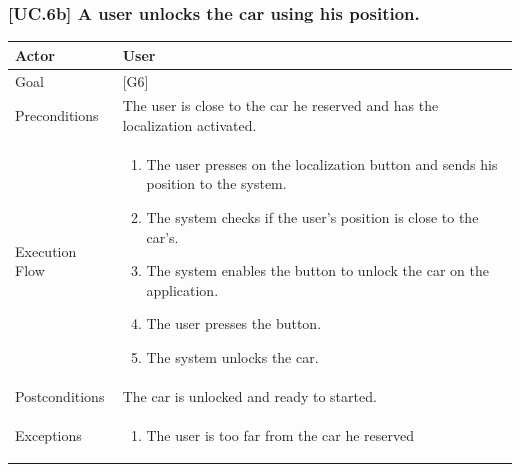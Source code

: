 \documentclass[english]{article}
\begin{document}
	\subsubsection{[UC.6b] A user unlocks the car using his position.}
	\begin{tabularx}{\textwidth}{  l  X  }
		\hline
		Actor & User\\
		\hline
		Goal & [G6]\\
		\hline
		Preconditions & The user is close to the car he reserved and has the localization activated.\\
		\hline
		Execution Flow & \begin{enumerate}
			\item{The user presses on the localization button and sends his position to the system.}
			\item{The system checks if the user's position is close to the car's.}
			\item{The system enables the button to unlock the car on the application.}
			\item{The user presses the button.}
			\item{The system unlocks the car.}
		\end{enumerate}\\
		\hline
		Postconditions & The car is unlocked and ready to started.\\
		\hline
		Exceptions & \begin{enumerate}
			\item{The user is too far from the car he reserved}
		\end{enumerate}\\
		\hline
	\end{tabularx}
\end{document}
